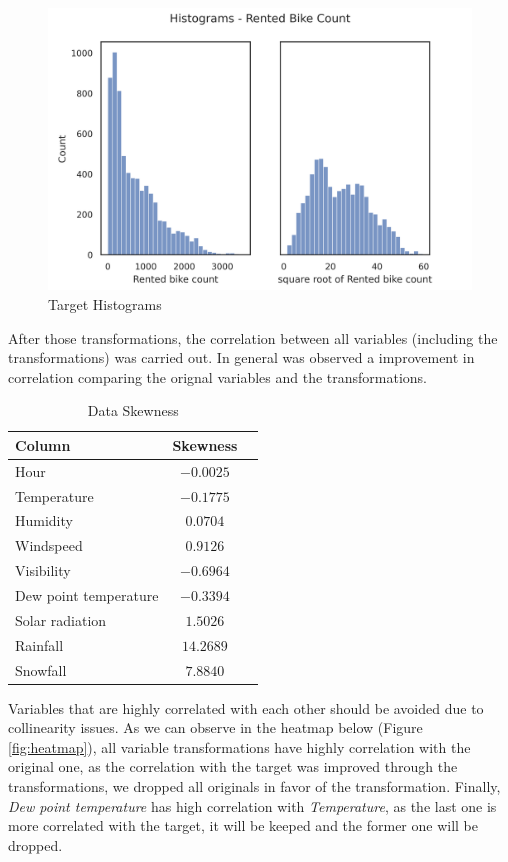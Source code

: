 \documentclass[11pt, a4]{article}
\begin{document}
\begin{figure}[!h]
\includegraphics[]{hist_target}
\centering
\caption{Target Histograms}
\label{fig:hist_target}
\end{figure}


After those transformations, the correlation between all variables (including the transformations) was carried out. In general was observed a improvement in correlation comparing the orignal variables and the transformations.

\begin{table}[h!]
\centering
\begin{tabular}{l c c}
\toprule
\textbf{Column} & \textbf{Skewness} \\
\midrule
Hour & $-0.0025$\\
Temperature & $-0.1775$\\
Humidity & $0.0704$\\ 
Windspeed & $0.9126$\\
Visibility & $-0.6964$\\
Dew point temperature & $-0.3394$\\
Solar radiation & $1.5026$\\
Rainfall & $14.2689$\\
Snowfall & $7.8840$ \\
\bottomrule
\end{tabular}
\caption{Data Skewness}
\label{table:2}
\end{table}

Variables that are highly correlated with each other should be avoided due to collinearity issues. As we can observe in the heatmap below (Figure \ref{fig:heatmap}), all variable transformations have highly correlation with the original one, as the correlation with the target was improved through the transformations, we dropped all originals in favor of the transformation. Finally, \textit{Dew point temperature} has high correlation with \textit{Temperature}, as the last one is more correlated with the target, it will be keeped and the former one will be dropped.
\end{document}
